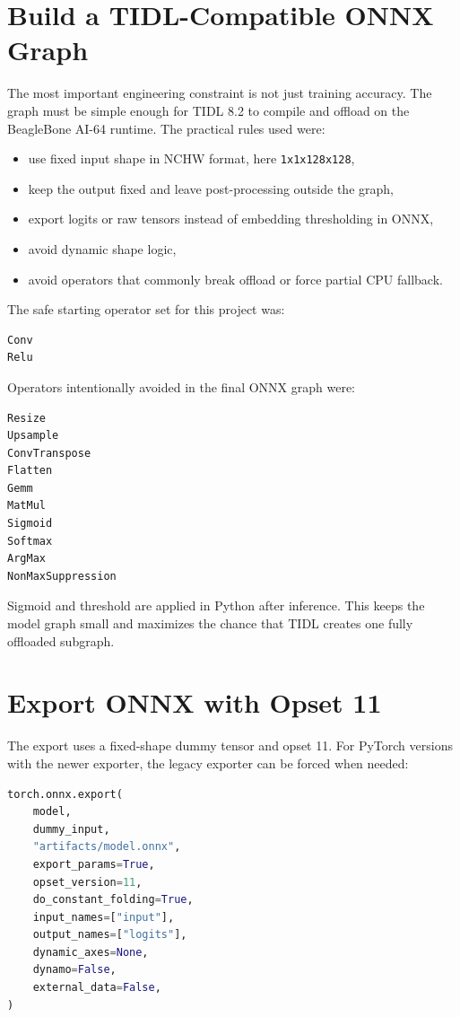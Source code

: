 \documentclass[11pt,a4paper]{article}
\begin{document}
\section{Build a TIDL-Compatible ONNX Graph}

The most important engineering constraint is not just training accuracy.  The graph must be simple enough for TIDL 8.2 to compile and offload on the BeagleBone AI-64 runtime.  The practical rules used were:

\begin{itemize}
\item use fixed input shape in NCHW format, here \texttt{1x1x128x128},
\item keep the output fixed and leave post-processing outside the graph,
\item export logits or raw tensors instead of embedding thresholding in ONNX,
\item avoid dynamic shape logic,
\item avoid operators that commonly break offload or force partial CPU fallback.
\end{itemize}

The safe starting operator set for this project was:

\begin{lstlisting}
Conv
Relu
\end{lstlisting}

Operators intentionally avoided in the final ONNX graph were:

\begin{lstlisting}
Resize
Upsample
ConvTranspose
Flatten
Gemm
MatMul
Sigmoid
Softmax
ArgMax
NonMaxSuppression
\end{lstlisting}

Sigmoid and threshold are applied in Python after inference.  This keeps the model graph small and maximizes the chance that TIDL creates one fully offloaded subgraph.

\section{Export ONNX with Opset 11}

The export uses a fixed-shape dummy tensor and opset 11.  For PyTorch versions with the newer exporter, the legacy exporter can be forced when needed:

\begin{lstlisting}[language=Python]
torch.onnx.export(
    model,
    dummy_input,
    "artifacts/model.onnx",
    export_params=True,
    opset_version=11,
    do_constant_folding=True,
    input_names=["input"],
    output_names=["logits"],
    dynamic_axes=None,
    dynamo=False,
    external_data=False,
)
\end{lstlisting}
\end{document}
